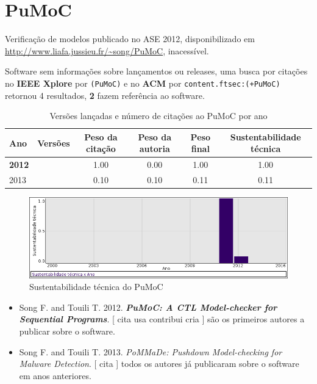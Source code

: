 \section{PuMoC}

Verificação de modelos
publicado no ASE 2012,
disponibilizado em \url{http://www.liafa.jussieu.fr/~song/PuMoC},
inacessível.

Software sem informações sobre lançamentos ou releases,
uma busca por citações no {\bf IEEE Xplore} por
\texttt{(PuMoC)}
e no {\bf ACM} por
\texttt{content.ftsec:(+PuMoC)}
retornou
4 resultados,
{\bf 2} fazem referência ao software.


\begin{table}[H]
\caption{Versões lançadas e número de citações ao PuMoC por ano}
\centering
\begin{tabular}{| l | c | c | c | c | c |}
  \hline
  Ano & Versões & Peso da citação & Peso da autoria & Peso final & Sustentabilidade técnica \\
  \hline
            {\bf 2012}
          &
          
          &
          1.00
          &
          0.00
          &
          1.00
          &
            {\color{blue} 1.00}
          \\
\hline
            2013
          &
          
          &
          0.10
          &
          0.10
          &
          0.11
          &
            {\color{red} 0.11}
          \\
\hline
\end{tabular}
\end{table}

\begin{figure}[h]
  \center
  \includegraphics[scale=0.50]{imagens/softwares-charts/pumoc.png}
  \caption{Sustentabilidade técnica do PuMoC}
\end{figure}


\begin{itemize}
\item Song F. and Touili T.
      2012.
        \textbf{\textit{ PuMoC: A CTL Model-checker for Sequential Programs}}.
      [
          cita
          usa
          contribui
          cria
      ]
são os primeiros autores a publicar sobre o software.
\item Song F. and Touili T.
      2013.
        \textit{ PoMMaDe: Pushdown Model-checking for Malware Detection}.
      [
          cita
      ]
todos os autores já publicaram sobre o software em anos anteriores.
\end{itemize}
